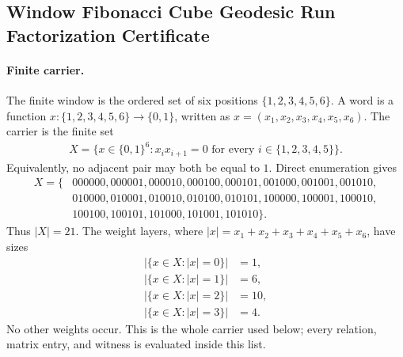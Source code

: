 \subsection{Window Fibonacci Cube Geodesic Run Factorization Certificate}
\label{sec:window-fibonacci-cube-geodesic-run-factorization-certificate}

\paragraph{Finite carrier.}
The finite window is the ordered set of six positions $\{1,2,3,4,5,6\}$. A word is a function $x:\{1,2,3,4,5,6\}\to\{0,1\}$, written as $x=(x_1,x_2,x_3,x_4,x_5,x_6)$. The carrier is the finite set
$$
\begin{aligned}
X=\{x\in\{0,1\}^6: x_i x_{i+1}=0\text{ for every }i\in\{1,2,3,4,5\}\}.
\end{aligned}
$$
Equivalently, no adjacent pair may both be equal to $1$. Direct enumeration gives
$$
\begin{aligned}
X=\{&000000,000001,000010,000100,000101,001000,001001,001010,\\
&010000,010001,010010,010100,010101,100000,100001,100010,\\
&100100,100101,101000,101001,101010\}.
\end{aligned}
$$
Thus $|X|=21$. The weight layers, where $|x|=x_1+x_2+x_3+x_4+x_5+x_6$, have sizes
$$
\begin{aligned}
|\{x\in X:|x|=0\}|&=1,\\
|\{x\in X:|x|=1\}|&=6,\\
|\{x\in X:|x|=2\}|&=10,\\
|\{x\in X:|x|=3\}|&=4.
\end{aligned}
$$
No other weights occur. This is the whole carrier used below; every relation, matrix entry, and witness is evaluated inside this list.

